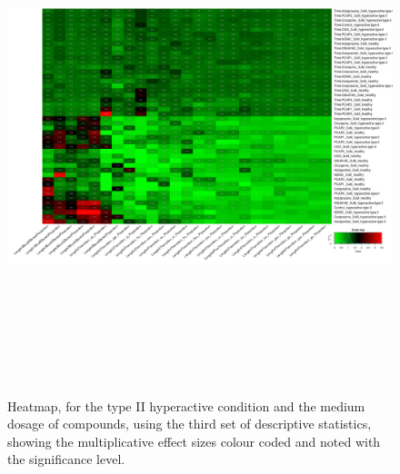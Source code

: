 \documentclass[a4paper,12pt]{article}
\begin{document}
\begin{figure}[h!]
\begin{center}
\includegraphics[width=16cm,height=15cm]{DarkPTZ_heatmap_3_microM_DarkPTZ_B1MAP.png}
\caption{Heatmap, for the type II hyperactive condition and the medium dosage of compounds, using the third set of descriptive statistics, showing the multiplicative effect sizes colour coded and noted with the significance level.}
\end{center}
\end{figure}
\newpage
\end{document}
